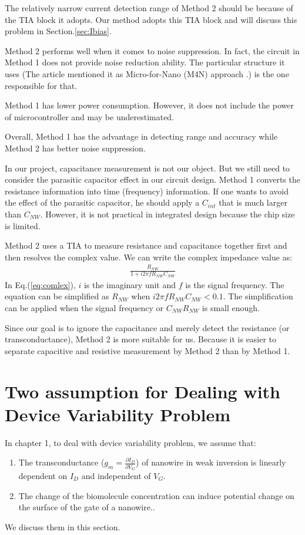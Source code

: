 The relatively narrow current detection range of Method 2 should be because of the TIA block it adopts.
Our method adopts this TIA block and will discuss this problem in Section.\ref{sec:Ibias}.

Method 2 performs well when it comes to noise suppression.
In fact, the circuit in Method 1 does not provide noise reduction ability.
The particular structure it uses (The article \cite{Juv1} mentioned it as Micro-for-Nano (M4N) approach \cite{M4N}.) is the one responsible for that.

Method 1 has lower power consumption. However, it does not include the power of microcontroller and may be underestimated.

Overall, Method 1 has the advantage in detecting range and accuracy while Method 2 has better noise suppression.

In our project, capacitance measurement is not our object.
But we still need to consider the parasitic capacitor effect in our circuit design.
Method 1 converts the resistance information into time (frequency) information.
If one wants to avoid the effect of the parasitic capacitor, he should apply a $C_{int}$ that is much larger than $C_{NW}$.
However, it is not practical in integrated design because the chip size is limited.

Method 2 uses a TIA to measure resistance and capacitance together first and then resolves the complex value.
We can write the complex impedance value as:
\begin{align}
      \frac{R_{NW}}{1 + i2\pi f R_{NW} C_{NW}} \label{eq:comlex}
\end{align}
In Eq.(\ref{eq:comlex}), $i$ is the imaginary unit and $f$ is the signal frequency.
The equation can be simplified as $R_{NW}$ when $i2\pi f R_{NW} C_{NW} < 0.1$.
The simplification can be applied when the signal frequency or $C_{NW} R_{NW}$ is small enough.

Since our goal is to ignore the capacitance and merely detect the resistance (or transconductance), Method 2 is more suitable for us.
Because it is easier to separate capacitive and resistive measurement by Method 2 than by Method 1.

\section{Two assumption for Dealing with Device Variability Problem} \label{sec:assumpDiscuss}
In chapter 1, to deal with device variability problem, we assume that:
\begin{enumerate}
    \item The transconductance ($g_m = \frac{\partial I_D}{\partial V_{G}}$) of nanowire in weak inversion is linearly dependent on $I_D$ and independent of $V_{G}$.
    \item The change of the biomolecule concentration can induce potential change on the surface of the gate of a nanowire..
\end{enumerate}
We discuss them in this section.

